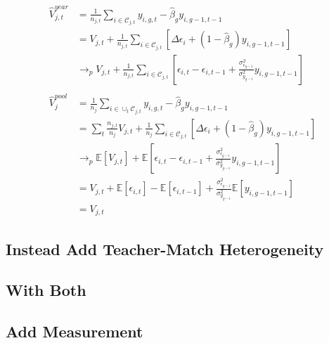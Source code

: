 \documentclass{article}
\theoremstyle{definition}
\theoremstyle{definition}
\begin{document}
\begin{align*}
\hat{V}^{year}_{j,t} &= \frac{1}{n_{j,t}}\sum_{i \in \mathcal{C}_{j,t}} y_{i,g,t} - \hat{\beta}_g y_{i,g-1,t-1} \\
             &=V_{j,t} + \frac{1}{n_{j,t}}\sum_{i \in \mathcal{C}_{j,t}}  \left [\Delta \epsilon_{i} +  \left (1 - \hat{\beta}_g  \right) y_{i,g-1,t-1} \right ] \\
             &\to_p V_{j,t} + \frac{1}{n_{j,t}}\sum_{i \in \mathcal{C}_{j,t}}  \left [ \epsilon_{i,t} - \epsilon_{i,t-1} + \frac{\sigma^2_{\epsilon_{g-1}}}{\sigma^2_{y_{g-1}}}   y_{i,g-1,t-1} \right ] \\
\\
\hat{V}^{pool}_{j} &= \frac{1}{n_{j}}\sum_{i \in \cup_t \mathcal{C}_{j,t}} y_{i,g,t} - \hat{\beta}_g y_{i,g-1,t-1} \\
              &=\sum_t \frac{n_{j,t}}{n_j} V_{j,t} + \frac{1}{n_{j}}\sum_{i \in \mathcal{C}_{j,t}}  \left [\Delta \epsilon_{i} +  \left (1 - \hat{\beta}_g  \right) y_{i,g-1,t-1} \right ] \\
              &\to_p \mathbb{E}[V_{j,t}] + \mathbb{E}  \left [ \epsilon_{i,t} - \epsilon_{i,t-1} + \frac{\sigma^2_{\epsilon_{g-1}}}{\sigma^2_{y_{g-1}}}   y_{i,g-1,t-1} \right ] \\
             & =  V_{j,t} + \mathbb{E}   [ \epsilon_{i,t}] - \mathbb{E}   [ \epsilon_{i,t-1}] + \frac{\sigma^2_{\epsilon_{g-1}}}{\sigma^2_{y_{g-1}}} \mathbb{E}   [   y_{i,g-1,t-1} ] \\
             & =  V_{j,t}
\end{align*}



\subsection{Instead Add Teacher-Match Heterogeneity}

\subsection{With Both}

\subsection{Add Measurement}


 
\end{document}
